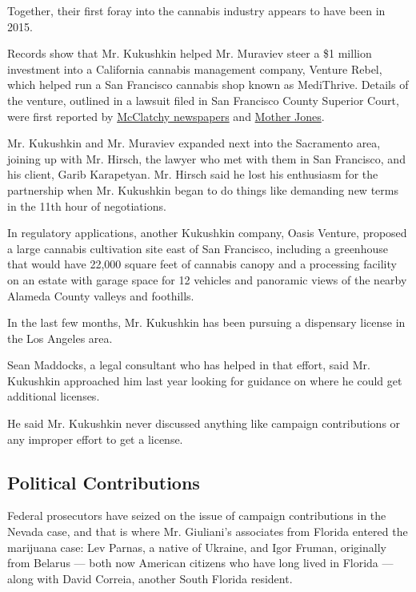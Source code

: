 Together, their first foray into the cannabis industry appears to have
been in 2015.

Records show that Mr. Kukushkin helped Mr. Muraviev steer a \$1 million
investment into a California cannabis management company, Venture Rebel,
which helped run a San Francisco cannabis shop known as MediThrive.
Details of the venture, outlined in a lawsuit filed in San Francisco
County Superior Court, were first reported by
\href{https://www.mcclatchydc.com/news/politics-government/article236028683.html}{McClatchy
newspapers} and
\href{https://www.motherjones.com/politics/2019/10/whos-the-secret-russian-in-the-indictment-of-giulianis-pals-we-found-some-clues/}{Mother
Jones}.

Mr. Kukushkin and Mr. Muraviev expanded next into the Sacramento area,
joining up with Mr. Hirsch, the lawyer who met with them in San
Francisco, and his client, Garib Karapetyan. Mr. Hirsch said he lost his
enthusiasm for the partnership when Mr. Kukushkin began to do things
like demanding new terms in the 11th hour of negotiations.

In regulatory applications, another Kukushkin company, Oasis Venture,
proposed a large cannabis cultivation site east of San Francisco,
including a greenhouse that would have 22,000 square feet of cannabis
canopy and a processing facility on an estate with garage space for 12
vehicles and panoramic views of the nearby Alameda County valleys and
foothills.

In the last few months, Mr. Kukushkin has been pursuing a dispensary
license in the Los Angeles area.

Sean Maddocks, a legal consultant who has helped in that effort, said
Mr. Kukushkin approached him last year looking for guidance on where he
could get additional licenses.

He said Mr. Kukushkin never discussed anything like campaign
contributions or any improper effort to get a license.

\hypertarget{political-contributions}{%
\subsection{Political Contributions}\label{political-contributions}}

Federal prosecutors have seized on the issue of campaign contributions
in the Nevada case, and that is where Mr. Giuliani's associates from
Florida entered the marijuana case: Lev Parnas, a native of Ukraine, and
Igor Fruman, originally from Belarus --- both now American citizens who
have long lived in Florida --- along with David Correia, another South
Florida resident.

